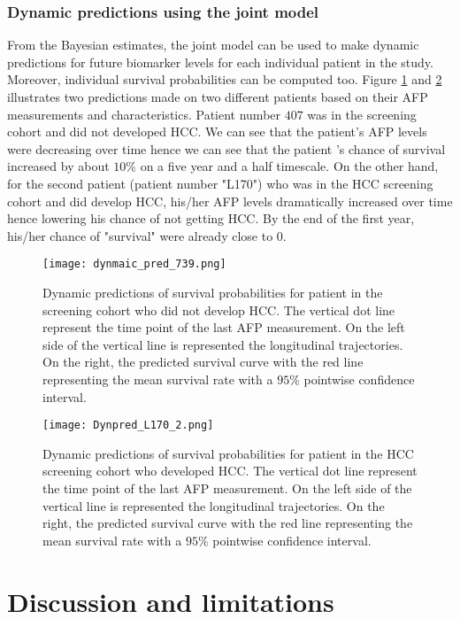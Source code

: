\documentclass[11pt,twoside]{article}
\numberwithin{Theorem}{section}
\numberwithin{Definition}{section}
\numberwithin{Lemma}{section}
\numberwithin{Algorithm}{section}
\numberwithin{equation}{section}
\begin{document}
 \subsubsection{Dynamic predictions using the joint model}
 From the Bayesian estimates, the joint model can be used to make dynamic predictions for future biomarker levels for each individual patient in the study. Moreover, individual survival probabilities can be computed too. Figure \ref{fig:Dynpred1} and \ref{fig:Dyn_pred2} illustrates two predictions made on two different patients based on their AFP measurements and characteristics. Patient number $407$ was in the screening cohort and did not developed HCC. We can see that the patient's AFP levels were decreasing over time hence we can see that the patient 's chance of survival increased by about $10\%$ on a five year and a half timescale. On the other hand, for the second patient (patient number "L170") who was in the HCC screening cohort and did develop HCC, his/her AFP levels dramatically increased over time hence lowering his chance of not getting HCC. By the end of the first year, his/her chance of "survival" were already close to $0$.
 \begin{figure}[h!]
    \centering
    \texttt{[image: dynmaic\_pred\_739.png]}
    \caption{Dynamic predictions of survival probabilities for patient in the screening cohort who did not develop HCC. The vertical dot line represent the time point of the last AFP measurement. On the left side of the vertical line is represented the longitudinal trajectories. On the right, the predicted survival curve with the red line representing the mean survival rate with a $95\%$ pointwise confidence interval.}
    \label{fig:Dynpred1}
\end{figure}
\begin{figure}[h!]
    \centering
    \texttt{[image: Dynpred\_L170\_2.png]}
    \caption{Dynamic predictions of survival probabilities for patient in the HCC screening cohort who developed HCC. The vertical dot line represent the time point of the last AFP measurement. On the left side of the vertical line is represented the longitudinal trajectories. On the right, the predicted survival curve with the red line representing the mean survival rate with a $95\%$ pointwise confidence interval.}
    \label{fig:Dyn_pred2}
\end{figure}
%
%
%
\clearpage
%
%
%
\section{Discussion and limitations}
\end{document}
